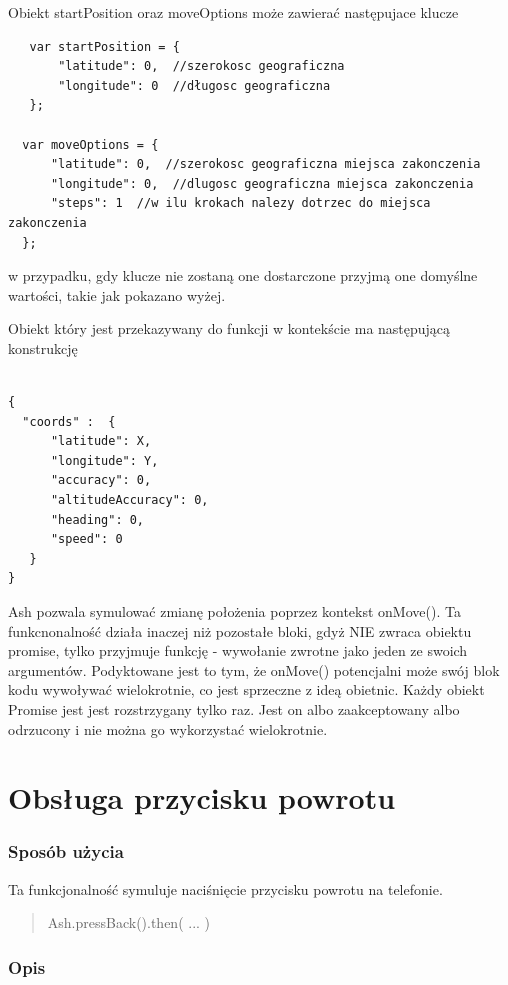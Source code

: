 \documentclass[brudnopis]{xmgr}
\begin{document}
Obiekt startPosition oraz moveOptions może zawierać następujace klucze

\begin{lstlisting}
   var startPosition = {
       "latitude": 0,  //szerokosc geograficzna
       "longitude": 0  //długosc geograficzna
   };
 
  var moveOptions = {
      "latitude": 0,  //szerokosc geograficzna miejsca zakonczenia
      "longitude": 0,  //dlugosc geograficzna miejsca zakonczenia
      "steps": 1  //w ilu krokach nalezy dotrzec do miejsca zakonczenia
  };
\end{lstlisting}

w przypadku, gdy klucze nie zostaną one dostarczone przyjmą one domyślne wartości, takie jak pokazano wyżej. 

Obiekt który jest przekazywany do funkcji w kontekście ma następującą konstrukcję 

\begin{lstlisting}

{
  "coords" :  {
      "latitude": X, 
      "longitude": Y,
      "accuracy": 0, 
      "altitudeAccuracy": 0, 
      "heading": 0, 
      "speed": 0
   }
}

\end{lstlisting}
Ash pozwala symulować zmianę położenia poprzez kontekst onMove(). Ta funkcnonalność działa inaczej niż pozostałe bloki, gdyż NIE zwraca obiektu promise, tylko przyjmuje funkcję - wywołanie zwrotne jako jeden ze swoich argumentów. Podyktowane jest to tym, że onMove() potencjalni może swój blok kodu wywoływać wielokrotnie, co jest sprzeczne z ideą obietnic. Każdy obiekt Promise jest jest rozstrzygany tylko raz. Jest on albo zaakceptowany albo odrzucony i nie można go wykorzystać wielokrotnie. 

\section{Obsługa przycisku powrotu}

\subsubsection{Sposób użycia}
Ta funkcjonalność symuluje naciśnięcie przycisku powrotu na telefonie. 

\begin{quote}
Ash.pressBack().then( ... ) 
\end{quote}

\subsubsection{Opis}
\end{document}
